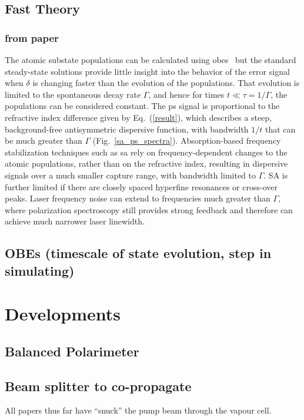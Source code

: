 \subsection{Fast Theory}

\subsubsection{from paper}
The atomic substate populations can be calculated using \glspl*{obe}~\cite{hughes_polarization_2009} but the standard steady-state solutions provide little insight into the behavior of the error signal when $\delta$ is changing faster than the evolution of the populations. That evolution is limited to the spontaneous decay rate $\Gamma$, and hence for times $t\ll \tau=1/\Gamma$, the populations can be considered constant.  The \gls*{ps} signal is proportional to the refractive index difference given by Eq.~(\ref{result}), which describes a steep, background-free antisymmetric dispersive function, with bandwidth $1/t$ that can be much greater than $\Gamma$ (Fig.~\ref{sa_ps_spectra}).  Absorption-based frequency stabilization techniques such as \gls*{sa} rely on frequency-dependent changes to the atomic populations, rather than on the refractive index, resulting in dispersive signals over a much smaller capture range, with bandwidth limited to $\Gamma$. SA is further limited if there are closely spaced hyperfine resonances or cross-over peaks.  Laser frequency noise can extend to frequencies much greater than $\Gamma$, where polarization spectroscopy still provides strong feedback and therefore can achieve much narrower laser linewidth.

\subsection{OBEs (timescale of state evolution, step in simulating)}
\section{Developments}
\subsection{Balanced Polarimeter}
\subsection{Beam splitter to co-propagate}

All papers thus far have ``snuck'' the pump beam through the vapour cell.

